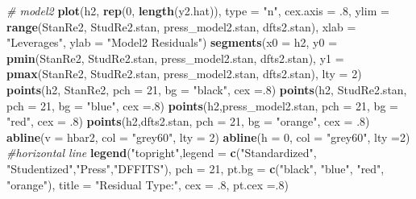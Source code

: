 \documentclass[]{article}
\newenvironment{Shaded}{\begin{snugshade}}{\end{snugshade}}
\newcommand{\KeywordTok}[1]{\textcolor[rgb]{0.13,0.29,0.53}{\textbf{#1}}}
\newcommand{\DataTypeTok}[1]{\textcolor[rgb]{0.13,0.29,0.53}{#1}}
\newcommand{\DecValTok}[1]{\textcolor[rgb]{0.00,0.00,0.81}{#1}}
\newcommand{\StringTok}[1]{\textcolor[rgb]{0.31,0.60,0.02}{#1}}
\newcommand{\CommentTok}[1]{\textcolor[rgb]{0.56,0.35,0.01}{\textit{#1}}}
\newcommand{\NormalTok}[1]{#1}
\begin{document}
\begin{Shaded}
\begin{Highlighting}[]
\CommentTok{# model2}
\KeywordTok{plot}\NormalTok{(h2, }\KeywordTok{rep}\NormalTok{(}\DecValTok{0}\NormalTok{, }\KeywordTok{length}\NormalTok{(y2.hat)), }\DataTypeTok{type =} \StringTok{"n"}\NormalTok{, }\DataTypeTok{cex.axis =}\NormalTok{ .}\DecValTok{8}\NormalTok{, }
     \DataTypeTok{ylim =} \KeywordTok{range}\NormalTok{(StanRe2, StudRe2.stan, press_model2.stan, dfts2.stan),}
     \DataTypeTok{xlab =} \StringTok{"Leverages"}\NormalTok{, }\DataTypeTok{ylab =} \StringTok{"Model2 Residuals"}\NormalTok{)}
\KeywordTok{segments}\NormalTok{(}\DataTypeTok{x0 =}\NormalTok{ h2,}
        \DataTypeTok{y0 =} \KeywordTok{pmin}\NormalTok{(StanRe2, StudRe2.stan, press_model2.stan, dfts2.stan),}
        \DataTypeTok{y1 =} \KeywordTok{pmax}\NormalTok{(StanRe2, StudRe2.stan, press_model2.stan, dfts2.stan),}
        \DataTypeTok{lty =} \DecValTok{2}\NormalTok{)}
\KeywordTok{points}\NormalTok{(h2, StanRe2, }\DataTypeTok{pch =} \DecValTok{21}\NormalTok{, }\DataTypeTok{bg =} \StringTok{"black"}\NormalTok{, }\DataTypeTok{cex =}\NormalTok{.}\DecValTok{8}\NormalTok{)}
\KeywordTok{points}\NormalTok{(h2, StudRe2.stan, }\DataTypeTok{pch =} \DecValTok{21}\NormalTok{, }\DataTypeTok{bg =} \StringTok{"blue"}\NormalTok{, }\DataTypeTok{cex =}\NormalTok{.}\DecValTok{8}\NormalTok{)}
\KeywordTok{points}\NormalTok{(h2,press_model2.stan, }\DataTypeTok{pch =} \DecValTok{21}\NormalTok{, }\DataTypeTok{bg =} \StringTok{"red"}\NormalTok{, }\DataTypeTok{cex =}\NormalTok{ .}\DecValTok{8}\NormalTok{)}
\KeywordTok{points}\NormalTok{(h2,dfts2.stan, }\DataTypeTok{pch =} \DecValTok{21}\NormalTok{, }\DataTypeTok{bg =} \StringTok{"orange"}\NormalTok{, }\DataTypeTok{cex =}\NormalTok{ .}\DecValTok{8}\NormalTok{)}
\KeywordTok{abline}\NormalTok{(}\DataTypeTok{v =}\NormalTok{ hbar2, }\DataTypeTok{col =} \StringTok{"grey60"}\NormalTok{, }\DataTypeTok{lty =} \DecValTok{2}\NormalTok{)}
\KeywordTok{abline}\NormalTok{(}\DataTypeTok{h =} \DecValTok{0}\NormalTok{, }\DataTypeTok{col =} \StringTok{"grey60"}\NormalTok{, }\DataTypeTok{lty =}\DecValTok{2}\NormalTok{) }\CommentTok{#horizontal line}
\KeywordTok{legend}\NormalTok{(}\StringTok{"topright"}\NormalTok{,}\DataTypeTok{legend =} \KeywordTok{c}\NormalTok{(}\StringTok{"Standardized"}\NormalTok{, }\StringTok{"Studentized"}\NormalTok{,}\StringTok{"Press"}\NormalTok{,}\StringTok{"DFFITS"}\NormalTok{), }\DataTypeTok{pch =} \DecValTok{21}\NormalTok{, }\DataTypeTok{pt.bg =} \KeywordTok{c}\NormalTok{(}\StringTok{"black"}\NormalTok{, }\StringTok{"blue"}\NormalTok{, }\StringTok{"red"}\NormalTok{, }\StringTok{"orange"}\NormalTok{), }\DataTypeTok{title =} \StringTok{"Residual Type:"}\NormalTok{, }\DataTypeTok{cex =}\NormalTok{ .}\DecValTok{8}\NormalTok{, }\DataTypeTok{pt.cex =}\NormalTok{.}\DecValTok{8}\NormalTok{)   }
\end{Highlighting}
\end{Shaded}
\end{document}

